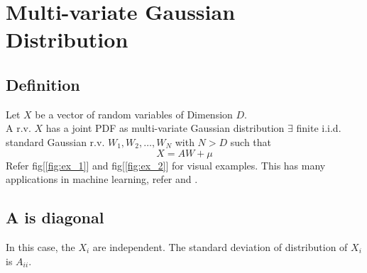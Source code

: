 \documentclass{article}
\begin{document}
\section{Multi-variate Gaussian Distribution}
\subsection{Definition}
Let $X$ be a vector of random variables of Dimension $D$.\\
A r.v. $X$ has a joint PDF as multi-variate Gaussian distribution $\exists$ finite i.i.d. standard Gaussian r.v. $W_1, W_2,\dots,W_N$ with $N > D$ such that\\
\[
    X = AW + \mu
\]
Refer fig[\ref{fig:ex_1}] and fig[\ref{fig:ex_2}] for visual examples. This has many applications in machine learning, refer \cite{book:carl_edward} and \cite{url:gaussian_processes}.

\subsection{A is diagonal}
In this case, the $X_i$ are independent. The standard deviation of distribution of $X_i$ is $A_{ii}$.
\end{document}
